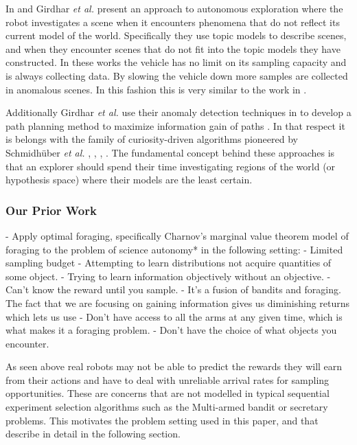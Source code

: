 % 
% 

In \cite{girdhar2013autonomous} and \cite{girdhar2013Aautonomous} Girdhar
\emph{et al.} present an approach to autonomous exploration where the robot
investigates a scene when it encounters phenomena that do not reflect its
current model of the world.  Specifically they use topic models to describe
scenes, and when they encounter scenes that do not fit into the topic models
they have constructed.  In these works the vehicle has no limit on its sampling
capacity and is always collecting data.  By slowing the vehicle down more
samples are collected in anomalous scenes.  In this fashion this is very
similar to the work in \cite{thompson2013adaptive}.

Additionally Girdhar \emph{et al.} use their anomaly detection techniques in
\cite{girdhar2013autonomous} to develop a path planning method to maximize
information gain of paths \cite{girdhar2014curiosity}.  In that respect it is
belongs with the family of curiosity-driven algorithms pioneered by
Schmidh{\"u}ber \emph{et al.} \cite{schmidhuber1997what},
\cite{schmidhuber2003exploring}, \cite{schmidhuber2009simple},
\cite{sun2011planning}.  The fundamental concept behind these approaches is
that an explorer should spend their time investigating regions of the world (or
hypothesis space) where their models are the least certain.

\subsubsection{Our Prior Work}
		- Apply optimal foraging, specifically Charnov's marginal value theorem
		model of foraging to the problem of science autonomy* in the following setting:	
			- Limited sampling budget
			- Attempting to learn distributions not acquire quantities of some object.
			- Trying to learn information objectively without an objective. 
			- Can't know the reward until you sample.
			- It's a fusion of bandits and foraging.  The fact that we are focusing on gaining information gives us diminishing returns which lets us use 
			- Don't have access to all the arms at any given time, which is what makes it a foraging problem.
			- Don't have the choice of what objects you encounter.

As seen above real robots may not be able to predict the rewards they will earn from their actions and have to deal with unreliable arrival rates for sampling opportunities.  These are concerns that are not modelled in typical sequential experiment selection algorithms such as the Multi-armed bandit or secretary problems.  This motivates the problem setting used in this paper, and that describe in detail in the following section.
